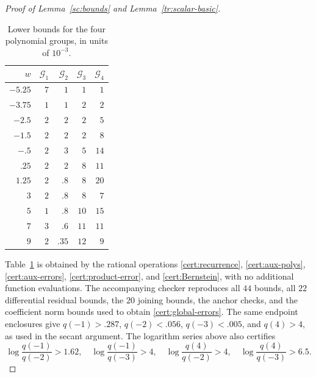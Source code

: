 \begin{proof}[Proof of Lemma~\ref{sc:bounds} and Lemma~\ref{tr:scalar-basic}]
\begin{table}[htbp]
\centering
\caption{Lower bounds for the four polynomial groups, in units of $10^{-3}$.}
\label{cert:group-bounds}
\begin{tabular}{r r r r r}
\hline
$w$&$\mathcal G_1$&$\mathcal G_2$&$\mathcal G_3$&$\mathcal G_4$\\\hline
$-5.25$&$7$&$1$&$1$&$1$\\
$-3.75$&$1$&$1$&$2$&$2$\\
$-2.5$&$2$&$2$&$2$&$5$\\
$-1.5$&$2$&$2$&$2$&$8$\\
$-.5$&$2$&$3$&$5$&$14$\\
$.25$&$2$&$2$&$8$&$11$\\
$1.25$&$2$&$.8$&$8$&$20$\\
$3$&$2$&$.8$&$8$&$7$\\
$5$&$1$&$.8$&$10$&$15$\\
$7$&$3$&$.6$&$11$&$11$\\
$9$&$2$&$.35$&$12$&$9$\\\hline
\end{tabular}
\end{table}

Table~\ref{cert:group-bounds} is obtained by the rational operations
\eqref{cert:recurrence}, \eqref{cert:aux-polys},
\eqref{cert:aux-errors}, \eqref{cert:product-error}, and
\eqref{cert:Bernstein}, with no additional function evaluations.
The accompanying checker reproduces all $44$ bounds, all $22$
differential residual bounds, the $20$ joining bounds, the anchor checks,
and the coefficient norm bounds used to obtain
\eqref{cert:global-errors}. The same endpoint enclosures give
$q(-1)>.287$, $q(-2)<.056$, $q(-3)<.005$, and $q(4)>4$, as used
in the secant argument. The logarithm series above also certifies
\[
 \log\frac{q(-1)}{q(-2)}>1.62,\quad
 \log\frac{q(-1)}{q(-3)}>4,\quad
 \log\frac{q(4)}{q(-2)}>4,\quad
 \log\frac{q(4)}{q(-3)}>6.5.
\]


\end{proof}
